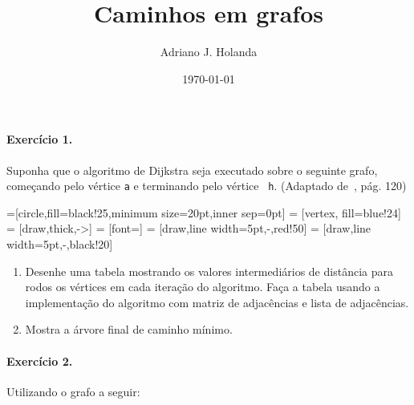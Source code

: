 \documentclass[12pt]{article}
\begin{document}
\title{Caminhos em grafos}
\author{Adriano J. Holanda}
\date{\today}

\paragraph{Exercício 1.}
Suponha que o algoritmo de Dijkstra seja executado sobre o seguinte
grafo, começando pelo vértice {\tt a} e terminando pelo vértice {\tt
  h}. (Adaptado de~\cite{dasgupta2009}, pág. 120) \bigskip

=[circle,fill=black!25,minimum size=20pt,inner sep=0pt]
 = [vertex, fill=blue!24]
 = [draw,thick,->]
 = [font=\small]
 = [draw,line width=5pt,-,red!50]
 = [draw,line width=5pt,-,black!20]


\begin{enumerate}
\item Desenhe uma tabela mostrando os valores intermediários de
  distância para rodos os vértices em cada iteração do algoritmo. Faça
  a tabela usando a implementação do algoritmo com matriz de
  adjacências e lista de adjacências.
\item Mostra a árvore final de caminho mínimo.
\end{enumerate}

\paragraph{Exercício 2.} Utilizando o grafo a seguir:~\cite{boaventura2009}
\end{document}
